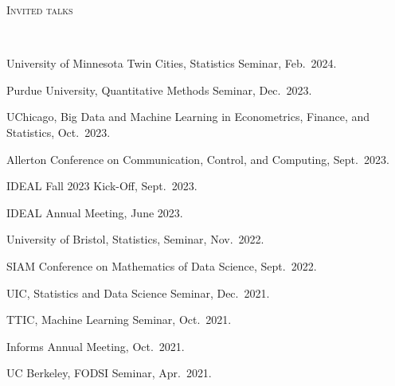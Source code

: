 \documentclass[a4paper, 10pt]{article}
\newenvironment{changemargin}[2]{%
  \begin{list}{}{%
    \setlength{\topsep}{0pt}%
    \setlength{\leftmargin}{#1}%
    \setlength{\rightmargin}{#2}%
    \setlength{\listparindent}{\parindent}%
    \setlength{\itemindent}{\parindent}%
    \setlength{\parsep}{\parskip}%
  }%
  \item[]}{\end{list}
}
\newcommand{\lineover}{
	\begin{changemargin}{-0.05in}{-0.05in}
		\vspace*{-8pt}
		\hrulefill \\
		\vspace*{-2pt}
	\end{changemargin}
}
\newcommand{\header}[1]{
	\begin{changemargin}{-0.5in}{-0.5in}
		\scshape{#1}\\
  	\lineover
	\end{changemargin}
}
\newenvironment{body} {
	\vspace*{-16pt}
	\begin{changemargin}{-0.3in}{-0.5in}
  }	
	{\end{changemargin}
}
\begin{document}
\bigskip
\header{\LARGE{Invited talks}}
\begin{body}
	\vspace{18pt}
	\begin{enumerate}[label={[{T}{{\arabic*}}]}]
	
	\item University of Minnesota Twin Cities, Statistics Seminar, Feb.~2024.
	\item Purdue University, Quantitative Methods Seminar, Dec.~2023.
	\item UChicago, Big Data and Machine Learning in Econometrics, Finance, and Statistics, Oct.~2023.
	\item Allerton Conference on Communication, Control, and Computing, Sept.~2023.
	
	\item IDEAL Fall 2023 Kick-Off, Sept.~2023.
	
	\item IDEAL Annual Meeting, June 2023.
	\item University of Bristol, Statistics, Seminar, Nov.~2022. 
	
	\item SIAM Conference on Mathematics of Data Science, Sept.~2022.
	
	\item UIC, Statistics and Data Science Seminar, Dec.~2021. 
	
	
	\item TTIC, Machine Learning Seminar, Oct.~2021.
	
	\item Informs Annual Meeting, Oct.~2021.
	
	\item UC Berkeley, FODSI Seminar, Apr.~2021. 
	

\end{enumerate}
\end{body}
\end{document}
